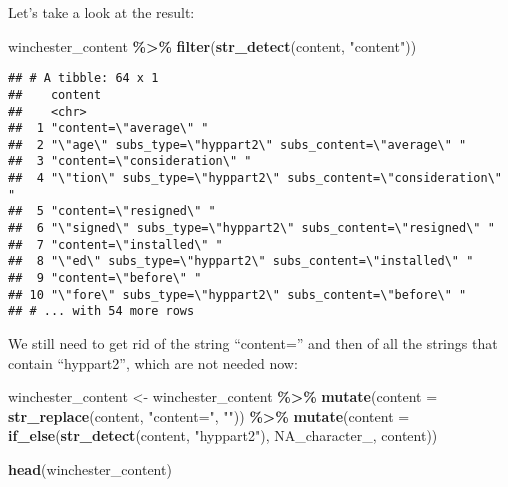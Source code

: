 \documentclass[
]{article}
\newenvironment{Shaded}{\begin{snugshade}}{\end{snugshade}}
\newcommand{\DataTypeTok}[1]{\textcolor[rgb]{0.13,0.29,0.53}{#1}}
\newcommand{\KeywordTok}[1]{\textcolor[rgb]{0.13,0.29,0.53}{\textbf{#1}}}
\newcommand{\NormalTok}[1]{#1}
\newcommand{\OperatorTok}[1]{\textcolor[rgb]{0.81,0.36,0.00}{\textbf{#1}}}
\newcommand{\OtherTok}[1]{\textcolor[rgb]{0.56,0.35,0.01}{#1}}
\newcommand{\StringTok}[1]{\textcolor[rgb]{0.31,0.60,0.02}{#1}}
\begin{document}
Let's take a look at the result:

\begin{Shaded}
\begin{Highlighting}[]
\NormalTok{winchester\_content }\OperatorTok{\%\textgreater{}\%}\StringTok{ }
\StringTok{  }\KeywordTok{filter}\NormalTok{(}\KeywordTok{str\_detect}\NormalTok{(content, }\StringTok{"content"}\NormalTok{))}
\end{Highlighting}
\end{Shaded}

\begin{verbatim}
## # A tibble: 64 x 1
##    content                                                          
##    <chr>                                                            
##  1 "content=\"average\" "                                           
##  2 "\"age\" subs_type=\"hyppart2\" subs_content=\"average\" "       
##  3 "content=\"consideration\" "                                     
##  4 "\"tion\" subs_type=\"hyppart2\" subs_content=\"consideration\" "
##  5 "content=\"resigned\" "                                          
##  6 "\"signed\" subs_type=\"hyppart2\" subs_content=\"resigned\" "   
##  7 "content=\"installed\" "                                         
##  8 "\"ed\" subs_type=\"hyppart2\" subs_content=\"installed\" "      
##  9 "content=\"before\" "                                            
## 10 "\"fore\" subs_type=\"hyppart2\" subs_content=\"before\" "       
## # ... with 54 more rows
\end{verbatim}

We still need to get rid of the string ``content='' and then of all the strings that contain ``hyppart2'',
which are not needed now:

\begin{Shaded}
\begin{Highlighting}[]
\NormalTok{winchester\_content \textless{}{-}}\StringTok{ }\NormalTok{winchester\_content }\OperatorTok{\%\textgreater{}\%}\StringTok{ }
\StringTok{  }\KeywordTok{mutate}\NormalTok{(}\DataTypeTok{content =} \KeywordTok{str\_replace}\NormalTok{(content, }\StringTok{"content="}\NormalTok{, }\StringTok{""}\NormalTok{)) }\OperatorTok{\%\textgreater{}\%}\StringTok{ }
\StringTok{  }\KeywordTok{mutate}\NormalTok{(}\DataTypeTok{content =} \KeywordTok{if\_else}\NormalTok{(}\KeywordTok{str\_detect}\NormalTok{(content, }\StringTok{"hyppart2"}\NormalTok{), }\OtherTok{NA\_character\_}\NormalTok{, content))}

\KeywordTok{head}\NormalTok{(winchester\_content)}
\end{Highlighting}
\end{Shaded}
\end{document}
